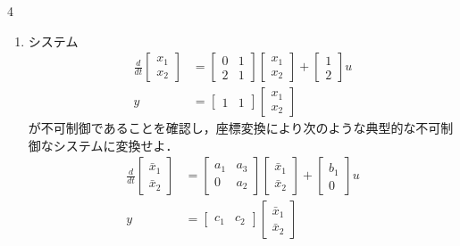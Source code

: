 \begin{multicols}{4}
\begin{enumerate}
\item
システム
\begin{align*}
	\frac{d}{dt}
	\left [
	\begin{array}{c}
	 x_1 \\ x_2 
	\end{array}
	\right ]
	& = 
	\left [
	\begin{array}{cc}
	 0 & 1 \\
	 2 & 1
	\end{array}
	\right ]
	\left [
	\begin{array}{c}
	 x_1 \\ x_2 
	\end{array}
	\right ]
	+
	\left [
	\begin{array}{c}
	 1 \\ 2 
	\end{array}
	\right ]
	u
\\
	y 
	&=
	\left [
	\begin{array}{cc}
	 1 & 1  
	\end{array}
	\right ]
	\left [
	\begin{array}{c}
	 x_1 \\ x_2 
	\end{array}
	\right ]
\end{align*}
が不可制御であることを確認し，座標変換により次のような典型的な不可制御なシステムに変換せよ．
\begin{align*}
	\frac{d}{dt}
	\left [
	\begin{array}{c}
	 \bar{x}_1 \\ \bar{x}_2 
	\end{array}
	\right ]
	& = 
	\left [
	\begin{array}{cc}
	 a_1 & a_3 \\
	 0   & a_2
	\end{array}
	\right ]
	\left [
	\begin{array}{c}
	 \bar{x}_1 \\ \bar{x}_2 
	\end{array}
	\right ]
	+
	\left [
	\begin{array}{c}
	 b_1 \\ 0 
	\end{array}
	\right ]
	u
\\
	y 
	&=
	\left [
	\begin{array}{cc}
	 c_1 & c_2  
	\end{array}
	\right ]
	\left [
	\begin{array}{c}
	 \bar{x}_1 \\ \bar{x}_2 
	\end{array}
	\right ]
\end{align*}



\end{enumerate}
\end{multicols}
